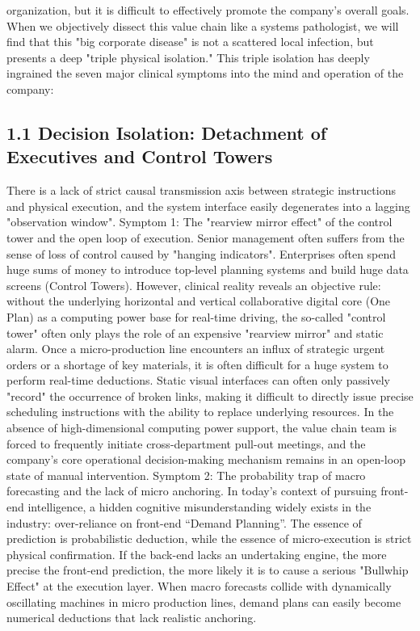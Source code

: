\documentclass[11pt,a4paper]{article}
\begin{document}
organization, but it is difficult to effectively promote the company's overall goals. When we objectively dissect this value chain like a systems pathologist, we will find that this "big corporate disease" is not a scattered local infection, but presents a deep "triple physical isolation." This triple isolation has deeply ingrained the seven major clinical symptoms into the mind and operation of the company:


\subsection*{1.1 Decision Isolation: Detachment of Executives and Control Towers}


There is a lack of strict causal transmission axis between strategic instructions and physical execution, and the system interface easily degenerates into a lagging "observation window". Symptom 1: The "rearview mirror effect" of the control tower and the open loop of execution. Senior management often suffers from the sense of loss of control caused by "hanging indicators". Enterprises often spend huge sums of money to introduce top-level planning systems and build huge data screens (Control Towers). However, clinical reality reveals an objective rule: without the underlying horizontal and vertical collaborative digital core (One Plan) as a computing power base for real-time driving, the so-called "control tower" often only plays the role of an expensive "rearview mirror" and static alarm. Once a micro-production line encounters an influx of strategic urgent orders or a shortage of key materials, it is often difficult for a huge system to perform real-time deductions. Static visual interfaces can often only passively "record" the occurrence of broken links, making it difficult to directly issue precise scheduling instructions with the ability to replace underlying resources. In the absence of high-dimensional computing power support, the value chain team is forced to frequently initiate cross-department pull-out meetings, and the company's core operational decision-making mechanism remains in an open-loop state of manual intervention. Symptom 2: The probability trap of macro forecasting and the lack of micro anchoring. In today’s context of pursuing front-end intelligence, a hidden cognitive misunderstanding widely exists in the industry: over-reliance on front-end “Demand Planning”. The essence of prediction is probabilistic deduction, while the essence of micro-execution is strict physical confirmation. If the back-end lacks an undertaking engine, the more precise the front-end prediction, the more likely it is to cause a serious "Bullwhip Effect" at the execution layer. When macro forecasts collide with dynamically oscillating machines in micro production lines, demand plans can easily become numerical deductions that lack realistic anchoring.
\end{document}
